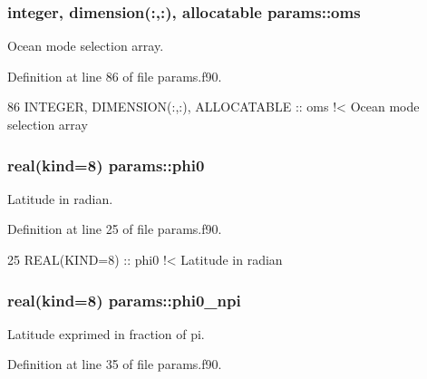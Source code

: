 \subsubsection[{\texorpdfstring{oms}{oms}}]{\setlength{\rightskip}{0pt plus 5cm}integer, dimension(\+:,\+:), allocatable params\+::oms}\hypertarget{namespaceparams_a5e25e072992d5908eea5308243b7ec63}{}\label{namespaceparams_a5e25e072992d5908eea5308243b7ec63}


Ocean mode selection array. 



Definition at line 86 of file params.\+f90.


\begin{DoxyCode}
86   \textcolor{keywordtype}{INTEGER}, \textcolor{keywordtype}{DIMENSION(:,:)}, \textcolor{keywordtype}{ALLOCATABLE} :: oms\textcolor{comment}{   !< Ocean mode selection array}
\end{DoxyCode}
\subsubsection[{\texorpdfstring{phi0}{phi0}}]{\setlength{\rightskip}{0pt plus 5cm}real(kind=8) params\+::phi0}\hypertarget{namespaceparams_a7e58166ca3fb2153f781aa623c5c31e6}{}\label{namespaceparams_a7e58166ca3fb2153f781aa623c5c31e6}


Latitude in radian. 



Definition at line 25 of file params.\+f90.


\begin{DoxyCode}
25   \textcolor{keywordtype}{REAL(KIND=8)} :: phi0\textcolor{comment}{      !< Latitude in radian}
\end{DoxyCode}
\subsubsection[{\texorpdfstring{phi0\+\_\+npi}{phi0_npi}}]{\setlength{\rightskip}{0pt plus 5cm}real(kind=8) params\+::phi0\+\_\+npi}\hypertarget{namespaceparams_a516e6c305e938087cfe780629c76ef64}{}\label{namespaceparams_a516e6c305e938087cfe780629c76ef64}


Latitude exprimed in fraction of pi. 



Definition at line 35 of file params.\+f90.


